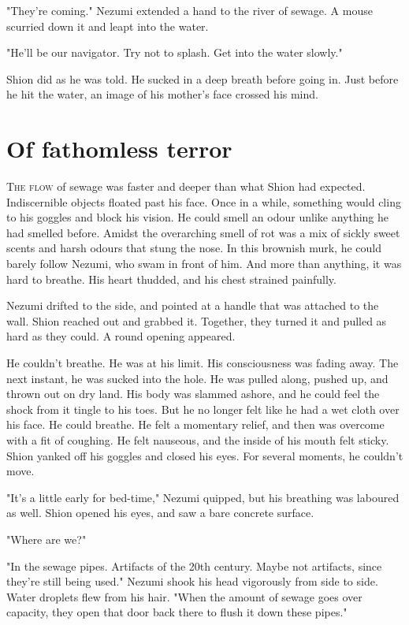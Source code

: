 "They're coming." Nezumi extended a hand to the river of sewage. A mouse
scurried down it and leapt into the water.

"He'll be our navigator. Try not to splash. Get into the water slowly."

Shion did as he was told. He sucked in a deep breath before going in.
Just before he hit the water, an image of his mother's face crossed his
mind.

\chapter{Of fathomless terror}

\lettrine{T}{he flow} of sewage was faster and deeper than what Shion had expected.
Indiscernible objects floated past his face. Once in a while, something
would cling to his goggles and block his vision. He could smell an odour
unlike anything he had smelled before. Amidst the overarching smell of
rot was a mix of sickly sweet scents and harsh odours that stung the
nose. In this brownish murk, he could barely follow Nezumi, who swam in
front of him. And more than anything, it was hard to breathe. His heart
thudded, and his chest strained painfully.

Nezumi drifted to the side, and pointed at a handle that was attached to
the wall. Shion reached out and grabbed it. Together, they turned it and
pulled as hard as they could. A round opening appeared.

He couldn't breathe. He was at his limit. His consciousness was fading
away. The next instant, he was sucked into the hole. He was pulled
along, pushed up, and thrown out on dry land. His body was slammed
ashore, and he could feel the shock from it tingle to his toes. But he
no longer felt like he had a wet cloth over his face. He could breathe.
He felt a momentary relief, and then was overcome with a fit of
coughing. He felt nauseous, and the inside of his mouth felt sticky.
Shion yanked off his goggles and closed his eyes. For several moments,
he couldn't move.

"It's a little early for bed-time," Nezumi quipped, but his breathing
was laboured as well. Shion opened his eyes, and saw a bare concrete
surface.

"Where are we?"

"In the sewage pipes. Artifacts of the 20th century. Maybe not
artifacts, since they're still being used." Nezumi shook his head
vigorously from side to side. Water droplets flew from his hair. "When
the amount of sewage goes over capacity, they open that door back there
to flush it down these pipes."

